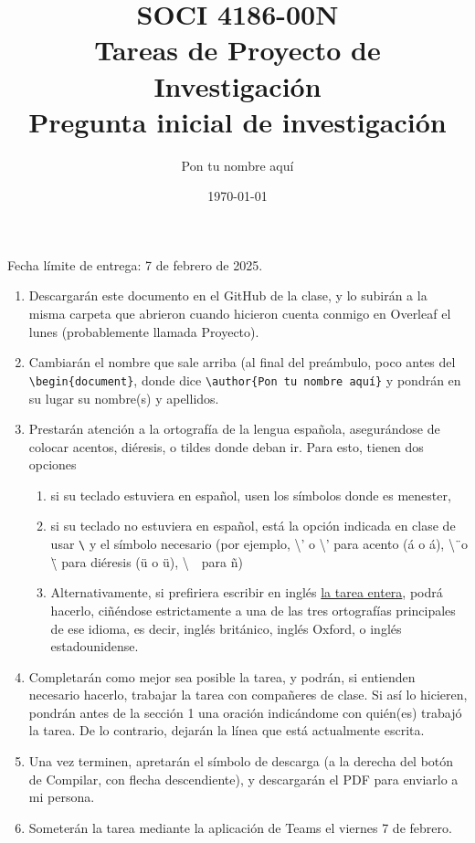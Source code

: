 \documentclass[11pt]{article}
\title{SOCI 4186-00N\\ Tareas de Proyecto de Investigación \textnumero 1 \\ Pregunta inicial de investigación}
\author{Pon tu nombre aquí}
\date{\today}
\begin{document}
\singlespacing
\maketitle
\onehalfspacing
Fecha límite de entrega: 7 de febrero de 2025.

\begin{enumerate}
    \item Descargarán este documento en el GitHub de la clase, y lo subirán a la misma carpeta que abrieron cuando hicieron cuenta conmigo en Overleaf el lunes (probablemente llamada Proyecto).
    \item Cambiarán el nombre que sale arriba (al final del preámbulo, poco antes del \texttt{\textbackslash begin\{document\}}, donde dice \texttt{\textbackslash author\{Pon tu nombre aquí\}} y pondrán en su lugar su nombre(s) y apellidos.
    \item Prestarán atención a la ortografía de la lengua española, asegurándose de colocar acentos, diéresis, o tildes donde deban ir. Para esto, tienen dos opciones 
    \begin{enumerate}
        \item si su teclado estuviera en español, usen los símbolos donde es menester,
        \item si su teclado no estuviera en español, está la opción indicada en clase de usar \texttt{\textbackslash} y el símbolo necesario (por ejemplo, \textbackslash' o \textbackslash'{} para acento (\'a o \'{a}), \textbackslash\"\ o \textbackslash\"{} para diéresis (\"u o \"{u}), \textbackslash~\ para \~n)
        \item Alternativamente, si prefiriera escribir en inglés \underline{la tarea entera}, podrá hacerlo, ciñéndose estrictamente a una de las tres ortografías principales de ese idioma, es decir, inglés británico, inglés Oxford, o inglés estadounidense.
    \end{enumerate}
    \item Completarán como mejor sea posible la tarea, y podrán, si entienden necesario hacerlo, trabajar la tarea con compañeres de clase. Si así lo hicieren, pondrán antes de la sección 1 una oración indicándome con quién(es) trabajó la tarea. De lo contrario, dejarán la línea que está actualmente escrita.
    \item  Una vez terminen, apretarán el símbolo de descarga (a la derecha del botón de Compilar, con flecha descendiente), y descargarán el PDF para enviarlo a mi persona.
    \item Someterán la tarea mediante la aplicación de Teams el viernes 7 de febrero.
\end{enumerate}
\end{document}
